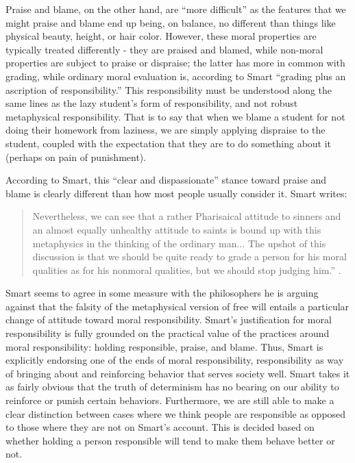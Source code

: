\documentclass[phd,12pt,oneside,paper=letterpaper]{ubcthesis}
\begin{document}
Praise and blame, on the other hand, are ``more difficult'' as the features that we might praise and blame end up being, on balance, no different than things like physical beauty, height, or hair color. However, these moral properties are typically treated differently - they are praised and blamed, while non-moral properties are subject to praise or dispraise; the latter has more in common with grading, while ordinary moral evaluation is, according to Smart ``grading plus an ascription of responsibility.'' This responsibility must be understood along the same lines as the lazy student's form of responsibility, and not robust metaphysical responsibility. That is to say that when we blame a student for not doing their homework from laziness, we are simply applying dispraise to the student, coupled with the expectation that they are to do something about it (perhaps on pain of punishment). 

According to Smart, this ``clear and dispassionate'' stance toward praise and blame is clearly different than how most people usually consider it. Smart writes:

\begin{quote}
Nevertheless, we can see that a rather Pharisaical attitude to sinners and an almost equally unhealthy attitude to saints is bound up with this metaphysics in the thinking of the ordinary man... The upshot of this discussion is that we should be quite ready to grade a person for his moral qualities as for his nonmoral qualities, but we should stop judging him.'' \citep[p.00]{smart1961}. 
\end{quote}

Smart seems to agree in some measure with the philosophers he is arguing against that the falsity of the metaphysical version of free will entails a particular change of attitude toward moral responsibility. Smart's justification for moral responsibility is fully grounded on the practical value of the practices around moral responsibility: holding responsible, praise, and blame. Thus, Smart is explicitly endorsing one of the ends of moral responsibility, responsibility as way of bringing about and reinforcing behavior that serves society well. Smart takes it as fairly obvious that the truth of determinism has no bearing on our ability to reinforce or punish certain behaviors. Furthermore, we are still able to make a clear distinction between cases where we think people are responsible as opposed to those where they are not on Smart's account. This is decided based on whether holding a person responsible will tend to make them behave better or not. 
\end{document}
